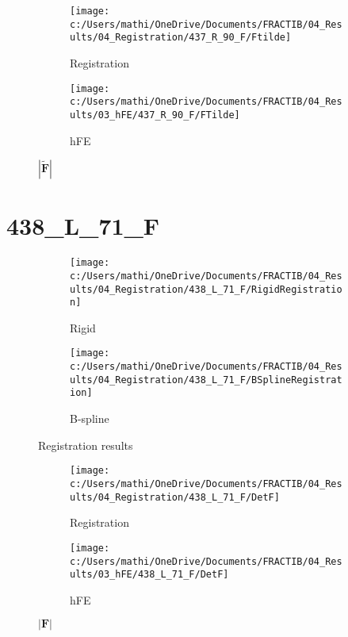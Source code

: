 \documentclass{article}%
\begin{document}
%


\begin{figure}[h!]%
\begin{subfigure}[b]{0.5\linewidth}%
\texttt{[image: c:/Users/mathi/OneDrive/Documents/FRACTIB/04\_Results/04\_Registration/437\_R\_90\_F/Ftilde]}%
\caption{Registration}%
\end{subfigure}%
\begin{subfigure}[b]{0.5\linewidth}%
\texttt{[image: c:/Users/mathi/OneDrive/Documents/FRACTIB/04\_Results/03\_hFE/437\_R\_90\_F/FTilde]}%
\caption{hFE}%
\end{subfigure}%
\caption{$|\widetilde{\mathbf{F}}|$}%
\end{figure}

%
\newpage%
\section*{438\_L\_71\_F}%
\label{sec:438L71F}%


\begin{figure}[h!]%
\begin{subfigure}[b]{0.5\linewidth}%
\texttt{[image: c:/Users/mathi/OneDrive/Documents/FRACTIB/04\_Results/04\_Registration/438\_L\_71\_F/RigidRegistration]}%
\caption{Rigid}%
\end{subfigure}%
\begin{subfigure}[b]{0.5\linewidth}%
\texttt{[image: c:/Users/mathi/OneDrive/Documents/FRACTIB/04\_Results/04\_Registration/438\_L\_71\_F/BSplineRegistration]}%
\caption{B{-}spline}%
\end{subfigure}%
\caption{Registration results}%
\end{figure}

%


\begin{figure}[h!]%
\begin{subfigure}[b]{0.5\linewidth}%
\texttt{[image: c:/Users/mathi/OneDrive/Documents/FRACTIB/04\_Results/04\_Registration/438\_L\_71\_F/DetF]}%
\caption{Registration}%
\end{subfigure}%
\begin{subfigure}[b]{0.5\linewidth}%
\texttt{[image: c:/Users/mathi/OneDrive/Documents/FRACTIB/04\_Results/03\_hFE/438\_L\_71\_F/DetF]}%
\caption{hFE}%
\end{subfigure}%
\caption{$|\mathbf{F}|$}%
\end{figure}

%
\end{document}
